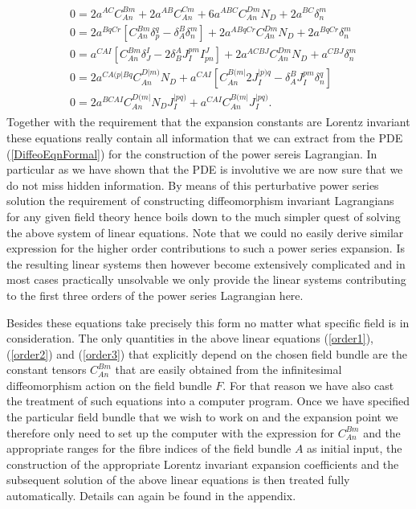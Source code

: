 \documentclass[a4paper,12pt, DIV=14, BCOR=5mm, twoside, headsepline]{scrbook}
\begin{document}
\begin{align}\label{order3}
\begin{aligned}
&0 = 2 a^{AC}C_{An}^{Bm} + 2a^{AB}C_{An}^{Cm} + 6 a^{ABC}C_{An}^{Dm} N_D + 2a^{BC} \delta^m_n\\
&0 = 2 a^{BqCr} \left [ C_{An}^{Bm} \delta ^q_p - \delta^B_A \delta^m_n \right ] +2 a^{A Bq Cr} C_{An}^{Dm} N_D + 2 a^{BqCr} \delta^m_n\\
&0 = a^{CAI} \left [C_{An}^{Bm}\delta^I _J- 2 \delta^A_B J_I^{pm}I^J_{pn} \right ] + 2 a^{ACBJ} C_{An}^{Dm} N_D + a^{CBJ} \delta ^m _n \\
&0 = 2 a^{C A(p \vert B q} C_{An}^{D \vert m )} N_D + a^{CAI} \left [C_{An}^{B(m\vert} 2 J_{I}^{\vert p)q} - \delta_A^BJ_I^{pm}\delta^q_n \right ]\\
&0 = 2 a^{BCAI}C_{An}^{D(m\vert}N_DJ_I^{\vert pq)} + a^{CAI}C_{An}^{B(m \vert} J_I^{\vert pq)}.
\end{aligned}
\end{align}
Together with the requirement that the expansion constants are Lorentz invariant these equations really contain all information that we can extract from the PDE (\ref{DiffeoEqnFormal}) for the construction of the power sereis Lagrangian. In particular as we have shown that the PDE is involutive we are now sure that we do not miss hidden information.  By means of this perturbative power series solution the requirement of constructing diffeomorphism invariant Lagrangians for any given field theory hence boils down to the much simpler quest of solving the above system of linear equations.
Note that we could no easily derive similar expression for the higher order contributions to such a power series expansion. Is the resulting linear systems then however become extensively complicated and in most cases practically unsolvable we only provide the linear systems contributing to the first three orders of the power series Lagrangian here. 

Besides these equations take precisely this form no matter what specific field is in consideration. The only quantities in the above linear equations (\ref{order1}), (\ref{order2}) and (\ref{order3}) that explicitly depend on the chosen field bundle are the constant tensors $C_{An}^{Bm}$ that are easily obtained from the infinitesimal diffeomorphism action on the field bundle $F$.  For that reason we have also cast the treatment of such equations into a computer program. Once we have specified the particular field bundle that we wish to work on and the expansion point we therefore only need to set up the computer with the expression for $C_{An}^{Bm}$ and the appropriate ranges for the fibre indices of the field bundle $A$ as initial input, the construction of the appropriate Lorentz invariant expansion coefficients and the subsequent solution of the above linear equations is then treated fully automatically. Details can again be found in the appendix. \\
\end{document}
